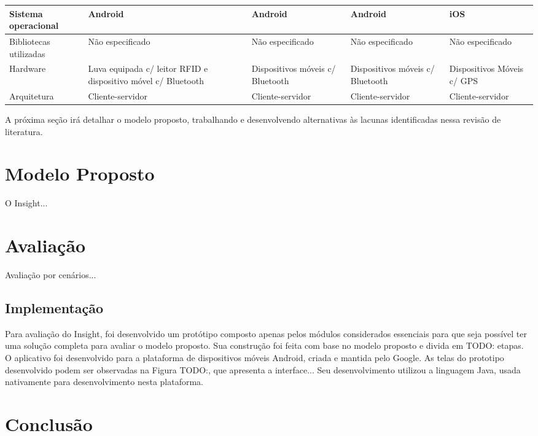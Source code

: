 \documentclass[twoside,english,brazilian]{UNISINOSartigo}
\begin{document}
\begin{table}
\begin{minipage}{1\textwidth}
\begin{adjustbox}{max width=\textwidth}
\begin{tabular}{ p{3cm} | p{3cm} | p{3cm} | p{3cm} | p{3cm} }
	Sistema operacional & Android & Android & Android & iOS \\ \hline
	Bibliotecas utilizadas & Não especificado & Não especificado & Não especificado & Não especificado \\ \hline
	Hardware & Luva equipada c/ leitor RFID e dispositivo móvel c/ Bluetooth & Dispositivos móveis c/ Bluetooth & Dispositivos móveis c/ Bluetooth & Dispositivos Móveis c/ GPS \\ \hline
	Arquitetura & Cliente-servidor & Cliente-servidor & Cliente-servidor & Cliente-servidor \\ \hline
		\end{tabular}
		\end{adjustbox}
	\end{minipage}
\end{table}

A próxima seção irá detalhar o modelo proposto, trabalhando e desenvolvendo alternativas às lacunas identificadas nessa revisão de literatura.

\section{Modelo Proposto}
O Insight...

\section{Avaliação}
Avaliação por cenários...

\subsection{Implementação}
Para avaliação do Insight, foi desenvolvido um protótipo composto apenas pelos módulos considerados essenciais para que seja possível ter uma solução completa para avaliar o modelo proposto. Sua construção foi feita com base no modelo proposto e divida em TODO: etapas.
O aplicativo foi desenvolvido para a plataforma de dispositivos móveis Android, criada e mantida pelo Google. As telas do prototipo desenvolvido podem ser observadas na Figura TODO:, que apresenta a interface... Seu desenvolvimento utilizou a linguagem Java, usada nativamente para desenvolvimento nesta plataforma.

\section{Conclusão}
\end{document}

